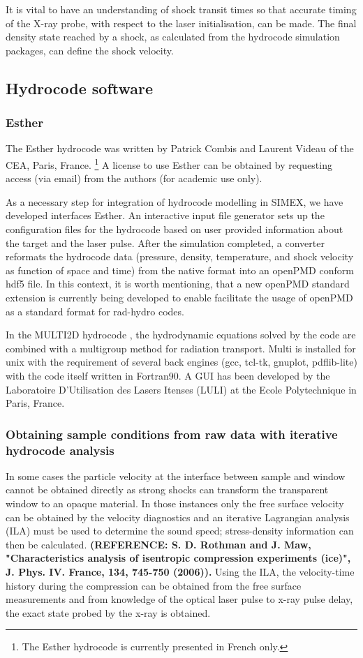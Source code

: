 \documentclass[12pt]{scrartcl}
\begin{document}
It is vital to have an understanding of shock transit times so that accurate timing of the X-ray probe,
with respect to the laser initialisation, can be made. The final density state reached by a shock, as calculated
from the hydrocode simulation packages, can define the shock velocity.

\subsection{Hydrocode software}
\subsubsection{Esther}
The Esther hydrocode was written by Patrick Combis and Laurent Videau of the CEA, Paris, France.
\footnote{The Esther hydrocode is currently presented in French only.}
A license to use Esther can be obtained by requesting access (via email) from the authors (for academic use only).

As a necessary step for integration of hydrocode modelling in SIMEX, we have
developed interfaces Esther. An interactive input file generator sets up
the configuration files for the hydrocode based on user provided information
about the target and the laser pulse. After the simulation completed, a
converter reformats the hydrocode data (pressure, density, temperature, and
shock velocity as function of space and time) from the native format into an
openPMD conform hdf5 file. In this context, it is worth mentioning, that a new
openPMD standard extension is currently being developed to enable facilitate the
usage of openPMD as a standard format for rad-hydro codes.

In the MULTI2D hydrocode \cite{Ramis2009}, the hydrodynamic equations solved by the code are combined with a multigroup method for radiation transport. Multi is installed for unix with the requirement of several back engines (gcc, tcl-tk, gnuplot, pdflib-lite) with the code itself written in Fortran90. A GUI has been developed by the Laboratoire D'Utilisation des Lasers Itenses (LULI) at the Ecole Polytechnique in Paris, France.

\subsubsection{Obtaining sample conditions from raw data with iterative hydrocode analysis}
In some cases the particle velocity at the interface between sample and window cannot be obtained directly as strong shocks can transform the transparent window to an opaque material. In those instances only the free surface velocity can be obtained by the velocity diagnostics and an iterative Lagrangian analysis (ILA) must be used to determine the sound speed; stress-density information can then be calculated. \textbf{(REFERENCE: S. D. Rothman and J. Maw, "Characteristics analysis of isentropic compression experiments (ice)", J. Phys. IV. France, 134, 745-750 (2006)).} Using the ILA, the velocity-time history during the compression can be obtained from the free surface measurements and from knowledge of the optical laser pulse to x-ray pulse delay, the exact state probed by the x-ray is obtained.
\end{document}
